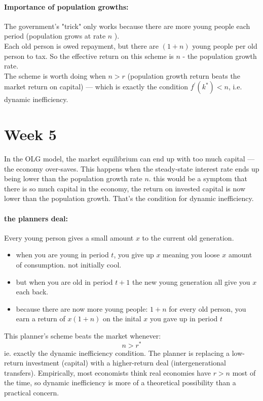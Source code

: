 \documentclass[12pt]{article}
\begin{document}
\paragraph{Importance of population growths:}
The government's "trick" only works because there are more young people each period (population grows at rate $n$ ).
\\
Each old person is owed repayment, but there are $(1+n)$ young people per old person to tax. So the effective return on this scheme is $n$ - the population growth rate.
\\
The scheme is worth doing when $n>r$ (population growth return beats the market return on capital) — which is exactly the condition $f^{\prime}\left(k^*\right)<n$, i.e. dynamic inefficiency.

\section{Week 5}
In the OLG model, the market equilibrium can end up with too much capital — the economy over-saves. This happens when the steady-state interest rate ends up being lower than the population growth rate $n$. this would be a symptom that there is so much capital in the economy, the return on invested capital is now lower than the population growth. That's the condition for dynamic inefficiency.
\paragraph{the planners deal:} Every young person gives a small amount $x$ to the current old generation.
\begin{itemize}
    \item when you are young in period $t$, you give up $x$ meaning you loose $x$ amount of consumption. not initially cool. 
    \item but when you are old in period $t+1$ the new young generation all give you $x$ each back.
    \item because there are now more young people: $1+n$ for every old person, you earn a return of $x(1+n)$ on the inital $x$ you gave up in period $t$
\end{itemize}
This planner's scheme beats the market whenever:
$$n>r^*$$
ie. exactly the dynamic inefficiency condition. The planner is replacing a low-return investment (capital) with a higher-return deal (intergenerational transfers). Empirically, most economists think real economies have $r>n$ most of the time, so dynamic inefficiency is more of a theoretical possibility than a practical concern.
\end{document}
